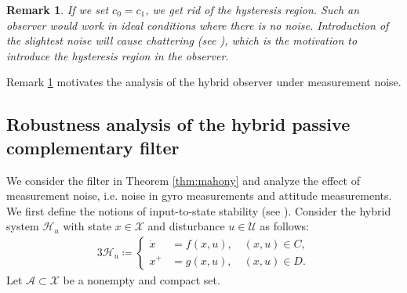 \documentclass{article}
\newtheorem{remark}{Remark}
\begin{document}
\begin{remark}\label{remark:hysteresis}
    If we set $c_0 = c_1$, we get rid of the hysteresis region. Such an observer would work in ideal conditions where there is no noise. Introduction of the slightest noise will cause chattering (see \cite{quaternion-ricardo}), which is the motivation to introduce the hysteresis region in the observer. 
\end{remark}

\begin{flushleft}
Remark \ref{remark:hysteresis} motivates the analysis of the hybrid observer under measurement noise. 
\end{flushleft}

\subsection{Robustness analysis of the hybrid passive complementary filter}
We consider the filter in Theorem \ref{thm:mahony} and analyze the effect of measurement noise, i.e. noise in gyro measurements and attitude measurements. We first define the notions of input-to-state stability (see \cite{Cai_and_Teel, Khalil}).  Consider the hybrid system $\mathcal{H}_u$ with state $x\in\mathcal{X}$ and disturbance $u\in\mathcal{U}$ as follows:
\begin{alignat}{3}\label{eq:ISS_system}
    \mathcal{H}_u\coloneqq \begin{cases}
        \dot{x} &= f(x,u), \quad (x,u)\in C,\\
        x^+ &= g(x,u), \quad (x,u)\in D.
    \end{cases}
\end{alignat}
Let $\mathcal{A}\subset\mathcal{X}$ be a nonempty and compact set. 
\end{document}
